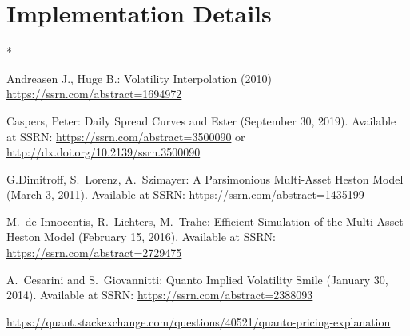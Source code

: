 \documentclass[12pt, a4paper]{article}
\begin{document}
\section{Implementation Details}


  
\begin{thebibliography}{*}

 Andreasen J., Huge B.: Volatility Interpolation (2010) \url{https://ssrn.com/abstract=1694972}

 Caspers, Peter: Daily Spread Curves and Ester (September 30, 2019). Available at SSRN:
  \url{https://ssrn.com/abstract=3500090} or \url{http://dx.doi.org/10.2139/ssrn.3500090}


  G.Dimitroff, S.~Lorenz, A.~Szimayer: A Parsimonious Multi-Asset Heston Model (March 3, 2011).
  Available at SSRN: \url{https://ssrn.com/abstract=1435199}

  M.~de Innocentis, R.~Lichters, M.~Trahe: Efficient Simulation of the Multi Asset Heston Model (February 15, 2016).
  Available at SSRN: \url{https://ssrn.com/abstract=2729475}

  A.~Cesarini and S.~Giovannitti: Quanto Implied Volatility Smile (January 30, 2014).
  Available at SSRN: \url{https://ssrn.com/abstract=2388093}

  \url{https://quant.stackexchange.com/questions/40521/quanto-pricing-explanation}
  

\end{thebibliography}
\end{document}
